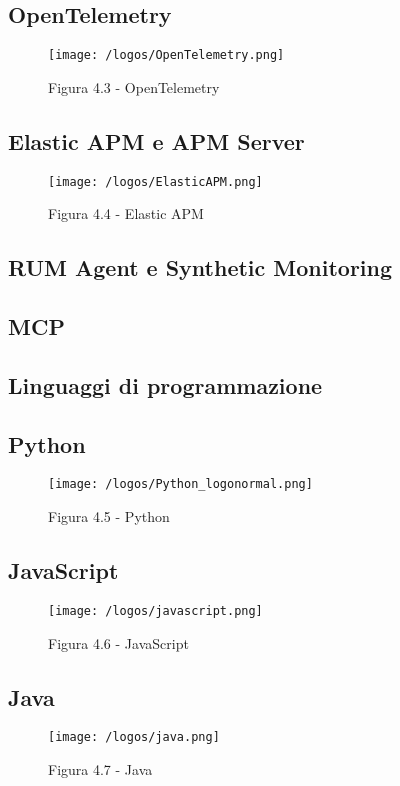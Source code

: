 \subsection*{OpenTelemetry}

\begin{figure}[H] 
    \centering 
    \texttt{[image: /logos/OpenTelemetry.png]} 
    \caption{Figura 4.3 - OpenTelemetry}
\end{figure}

\subsection*{Elastic APM e APM Server}
\begin{figure}[H] 
    \centering 
    \texttt{[image: /logos/ElasticAPM.png]} 
    \caption{Figura 4.4 - Elastic APM}
\end{figure}

\subsection*{RUM Agent e Synthetic Monitoring}

\subsection*{MCP}


\subsection{Linguaggi di programmazione}
\subsection*{Python}
\begin{figure}[H] 
    \centering 
    \texttt{[image: /logos/Python\_logonormal.png]} 
    \caption{Figura 4.5 - Python}
\end{figure}


\subsection*{JavaScript}
\begin{figure}[H] 
    \centering 
    \texttt{[image: /logos/javascript.png]} 
    \caption{Figura 4.6 - JavaScript}
\end{figure}


\subsection*{Java}
\begin{figure}[H] 
    \centering 
    \texttt{[image: /logos/java.png]} 
    \caption{Figura 4.7 - Java}
\end{figure}


